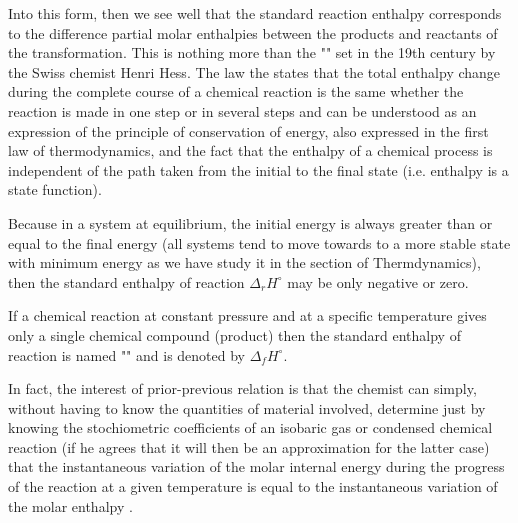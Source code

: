 	Into this form, then we see well that the standard reaction enthalpy corresponds to the difference partial molar enthalpies between the products and reactants of the transformation. This is nothing more than the "" set in the 19th century by the Swiss chemist Henri Hess. The law the states that the total enthalpy change during the complete course of a chemical reaction is the same whether the reaction is made in one step or in several steps and can be understood as an expression of the principle of conservation of energy, also expressed in the first law of thermodynamics, and the fact that the enthalpy of a chemical process is independent of the path taken from the initial to the final state (i.e. enthalpy is a state function).

	Because in a system at equilibrium, the initial energy is always greater than or equal to the final energy (all systems tend to move towards to a more stable state with minimum energy as we have study it in the section of Thermdynamics), then the standard enthalpy of reaction $\Delta_r H^\circ$ may be only negative or zero.

	If a chemical reaction at constant pressure and at a specific temperature gives only a single chemical compound (product) then the standard enthalpy of reaction is named  "" and is denoted by $\Delta_f H^\circ$.

	In fact, the interest of prior-previous relation is that the chemist can simply, without having to know the quantities of material involved, determine just by knowing the stochiometric coefficients of an isobaric  gas or condensed chemical reaction (if he agrees that it will then be an approximation for the latter case) that the instantaneous variation of the molar internal energy during the progress of the reaction at a given temperature is equal to the instantaneous variation of the molar enthalpy .

